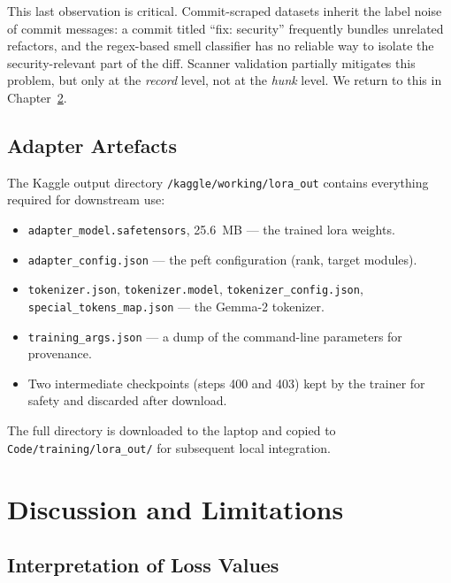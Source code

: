 \documentclass[12pt, a4paper]{report}
\begin{document}
This last observation is critical. Commit-scraped datasets inherit the
label noise of commit messages: a commit titled ``fix: security''
frequently bundles unrelated refactors, and the regex-based smell
classifier has no reliable way to isolate the security-relevant part of
the diff. Scanner validation partially mitigates this problem, but only
at the \emph{record} level, not at the \emph{hunk} level. We return to
this in Chapter~\ref{ch:discussion}.

\section{Adapter Artefacts}

The Kaggle output directory \texttt{/kaggle/working/lora\_out} contains
everything required for downstream use:

\begin{itemize}
  \item \texttt{adapter\_model.safetensors}, 25.6~MB --- the trained
        \gls{lora} weights.
  \item \texttt{adapter\_config.json} --- the \gls{peft} configuration
        (rank, target modules).
  \item \texttt{tokenizer.json}, \texttt{tokenizer.model},
        \texttt{tokenizer\_config.json},
        \texttt{special\_tokens\_map.json} --- the Gemma-2 tokenizer.
  \item \texttt{training\_args.json} --- a dump of the command-line
        parameters for provenance.
  \item Two intermediate checkpoints (steps 400 and 403) kept by the
        trainer for safety and discarded after download.
\end{itemize}

The full directory is downloaded to the laptop and copied to
\texttt{Code/training/lora\_out/} for subsequent local integration.

\chapter{Discussion and Limitations}
\label{ch:discussion}

\section{Interpretation of Loss Values}
\end{document}
